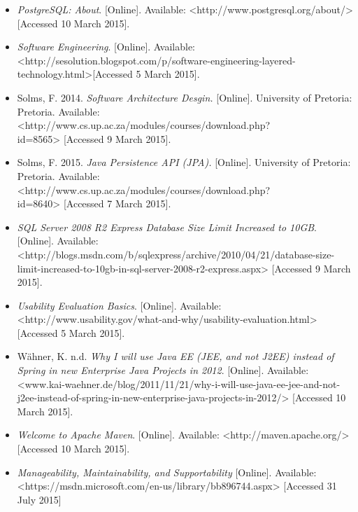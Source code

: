 \documentclass[a4paper,12pt]{article}
\begin{document}
\begin{itemize}
			\item \textit{PostgreSQL: About}. [Online]. Available: <http://www.postgresql.org/about/> [Accessed 10 March 2015].
			
			\item \textit{Software Engineering}. [Online]. Available: <http://sesolution.blogspot.com/p/software-engineering-layered-technology.html>[Accessed 5 March 2015].
								
			\item Solms, F. 2014. \textit{Software Architecture Desgin.} [Online]. University of Pretoria: Pretoria. Available: <http://www.cs.up.ac.za/modules/courses/download.php?\\id=8565> [Accessed 9 March 2015].
			
			\item Solms, F. 2015. \textit{Java Persistence API (JPA).} [Online]. University of Pretoria: Pretoria. Available: <http://www.cs.up.ac.za/modules/courses/download.php?\\id=8640> [Accessed 7 March 2015].
			
			\item \textit{SQL Server 2008 R2 Express Database Size Limit Increased to 10GB}. [Online]. Available: <http://blogs.msdn.com/b/sqlexpress/archive/2010/04/21/database-size-limit-increased-to-10gb-in-sql-server-2008-r2-express.aspx> [Accessed 9 March 2015].
			
			\item \textit{Usability Evaluation Basics}. [Online]. Available: <http://www.usability.gov/what-and-why/usability-evaluation.html> [Accessed 5 March 2015].

			\item Wähner, K. n.d. \textit{Why I will use Java EE (JEE, and not J2EE) instead of Spring in new Enterprise Java Projects in 2012}. [Online]. Available: <www.kai-waehner.de/blog/2011/11/21/why-i-will-use-java-ee-jee-and-not-j2ee-instead-of-spring-in-new-enterprise-java-projects-in-2012/> [Accessed 10 March 2015].		

			\item \textit{Welcome to Apache Maven}. [Online]. Available: <http://maven.apache.org/> [Accessed 10 March 2015].
			
			\item \textit{Manageability, Maintainability, and Supportability} [Online]. Available: <https://msdn.microsoft.com/en-us/library/bb896744.aspx> [Accessed 31 July 2015]
			
			

			

		\end{itemize}
\end{document}
